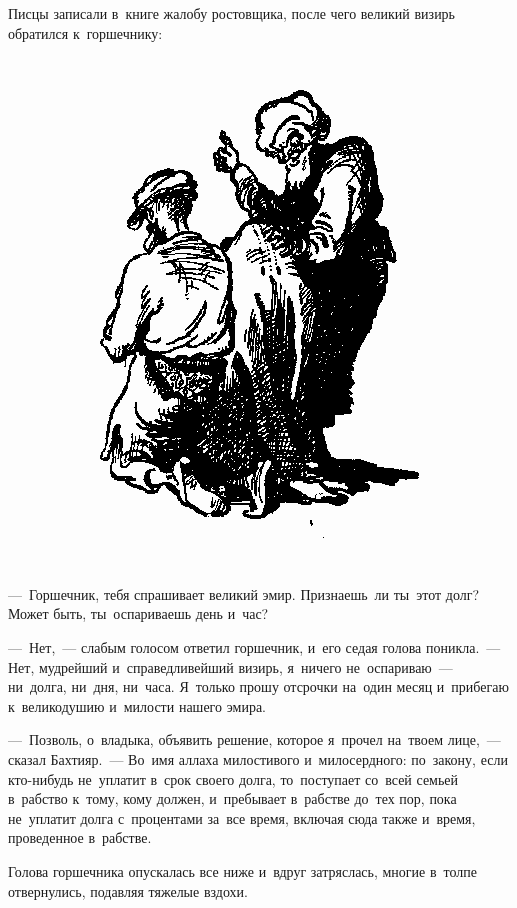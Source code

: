 \documentclass[12pt,a4paper]{book}
\begin{document}
Писцы записали в~книге жалобу ростовщика, после чего великий визирь обратился к~горшечнику:

\begin{figure}[h]
\centering
\includegraphics[scale=0.75]{7.png}
\end{figure}

—~Горшечник, тебя спрашивает великий эмир. Признаешь~ли ты~этот долг? Может быть, ты~оспариваешь день и~час?

—~Нет,~— слабым голосом ответил горшечник, и~его седая голова поникла.~— Нет, мудрейший и~справедливейший визирь, я~ничего не~оспариваю~— ни~долга, ни~дня, ни~часа. Я~только прошу отсрочки на~один месяц и~прибегаю к~великодушию и~милости нашего эмира.

—~Позволь, о~владыка, объявить решение, которое я~прочел на~твоем лице,~— сказал Бахтияр.~— Во~имя аллаха милостивого и~милосердного: по~закону, если кто-нибудь не~уплатит в~срок своего долга, то~поступает со~всей семьей в~рабство к~тому, кому должен, и~пребывает в~рабстве до~тех пор, пока не~уплатит долга с~процентами за~все время, включая сюда также и~время, проведенное в~рабстве.

Голова горшечника опускалась все ниже и~вдруг затряслась, многие в~толпе отвернулись, подавляя тяжелые вздохи.
\end{document}
